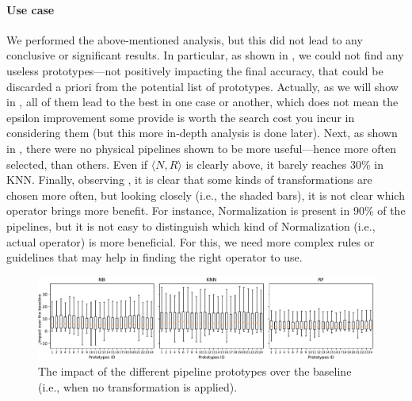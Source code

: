 \paragraph{Use case}
We performed the above-mentioned analysis, but this did not lead to any conclusive or significant results.
In particular, as shown in , we could not find any useless prototypes---not positively impacting the final accuracy, that could be discarded a priori from the potential list of prototypes.
Actually, as we will show in , all of them lead to the best in one case or another, which does not mean the epsilon improvement some provide is worth the search cost you incur in considering them (but this more in-depth analysis is done later).
Next, as shown in , there were no physical pipelines shown to be more useful---hence more often selected, than others.
Even if $\langle N , R \rangle$ is clearly above, it barely reaches 30\% in KNN.
Finally, observing , it is clear that some kinds of transformations are chosen more often, but looking closely (i.e., the shaded bars), it is not clear which operator brings more benefit.
For instance, Normalization is present in 90\% of the pipelines, but it is not easy to distinguish which kind of Normalization (i.e., actual operator) is more beneficial.
For this, we need more complex rules or guidelines that may help in finding the right operator to use.


\begin{figure}[!t]
	\centering
	\includegraphics[width=1.0\textwidth]{chapters/data-centric/supervised/img/prototypes_impact.pdf}
	\caption{The impact of the different pipeline prototypes over the baseline (i.e., when no transformation is applied).}
	\label{effective-fig:prototypes-impact}
\end{figure}


